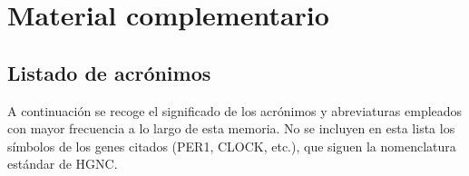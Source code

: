\documentclass[12pt, a4paper]{report}
\begin{document}



\appendix
\renewcommand{\appendixname}{Anexo}
\chapter{Material complementario}

\section*{Listado de acrónimos}
A continuación se recoge el significado de los acrónimos y abreviaturas empleados con mayor frecuencia a lo largo de esta memoria. No se incluyen en esta lista los símbolos de los genes citados (PER1, CLOCK, etc.), que siguen la nomenclatura estándar de HGNC.
\end{document}
